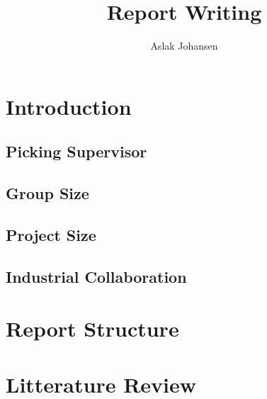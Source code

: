 \documentclass[a4paper]{memoir}
\title{Report Writing \\ \scalebox{0.85}{for Software BSc and MSc Projects}}
\author{Aslak Johansen}
\begin{document}
\maketitle
\tableofcontents

\chapter{Introduction}

\section{Picking Supervisor}

\section{Group Size}

\section{Project Size}

\section{Industrial Collaboration}

\chapter{Report Structure}

\chapter{Litterature Review}
\end{document}
